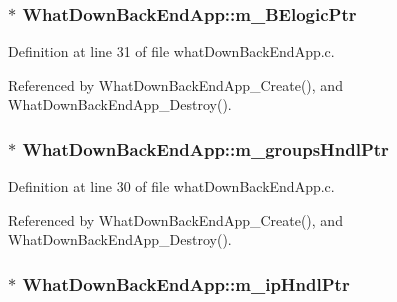 \subsubsection[{\texorpdfstring{m\+\_\+\+B\+Elogic\+Ptr}{m_BElogicPtr}}]{$\ast$ What\+Down\+Back\+End\+App\+::m\+\_\+\+B\+Elogic\+Ptr}\hypertarget{structWhatDownBackEndApp_a4ea6f6682366eb894b19ba64aa40eb3b}{}\label{structWhatDownBackEndApp_a4ea6f6682366eb894b19ba64aa40eb3b}


Definition at line 31 of file what\+Down\+Back\+End\+App.\+c.



Referenced by What\+Down\+Back\+End\+App\+\_\+\+Create(), and What\+Down\+Back\+End\+App\+\_\+\+Destroy().

\subsubsection[{\texorpdfstring{m\+\_\+groups\+Hndl\+Ptr}{m_groupsHndlPtr}}]{$\ast$ What\+Down\+Back\+End\+App\+::m\+\_\+groups\+Hndl\+Ptr}\hypertarget{structWhatDownBackEndApp_ac5da91e05de138dceaba6b9c71c29bae}{}\label{structWhatDownBackEndApp_ac5da91e05de138dceaba6b9c71c29bae}


Definition at line 30 of file what\+Down\+Back\+End\+App.\+c.



Referenced by What\+Down\+Back\+End\+App\+\_\+\+Create(), and What\+Down\+Back\+End\+App\+\_\+\+Destroy().

\subsubsection[{\texorpdfstring{m\+\_\+ip\+Hndl\+Ptr}{m_ipHndlPtr}}]{$\ast$ What\+Down\+Back\+End\+App\+::m\+\_\+ip\+Hndl\+Ptr}\hypertarget{structWhatDownBackEndApp_a34f5abe32cd1b0ab718376ab68c8d457}{}\label{structWhatDownBackEndApp_a34f5abe32cd1b0ab718376ab68c8d457}


